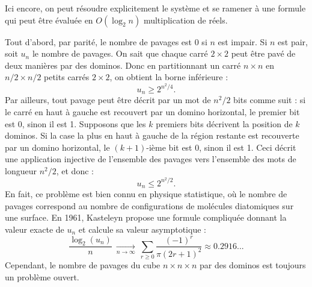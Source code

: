 

Ici encore, on peut résoudre explicitement le système et se ramener à une formule qui peut être évaluée en $O(\log_2n)$ multiplication de réels.

\Q
Tout d'abord, par parité, le nombre de pavages est 0 si $n$ est impair. Si $n$ est pair, soit $u_n$ le nombre de pavages. On sait que chaque carré $2 \times 2$ peut être pavé de deux manières par des dominos. Donc en partitionnant un carré $n \times n$ en $n/2 \times n/2$ petits carrés $2 \times 2$, on obtient la borne inférieure :
\[
    u_n \geq 2^{n^2/4}.
\]
Par ailleurs, tout pavage peut être décrit par un mot de $n^2/2$ bits comme suit : si le carré en haut à gauche est recouvert par un domino horizontal, le premier bit est 0, sinon il est 1. Supposons que les $k$ premiers bits décrivent la position de $k$ dominos. Si la case la plus en haut à gauche de la région restante est recouverte par un domino horizontal, le $(k+1)$-ième bit est 0, sinon il est 1. Ceci décrit une application injective de l'ensemble des pavages vers l'ensemble des mots de longueur $n^2/2$, et donc :
\[
    u_n \leq 2^{n^2/2}.
\]
En fait, ce problème est bien connu en physique statistique, où le nombre de pavages correspond au nombre de configurations de molécules diatomiques sur une surface. En 1961, Kasteleyn propose une formule compliquée donnant la valeur exacte de $u_n$ et calcule sa valeur asymptotique :
\[
    \frac{\log_2(u_n)}{n}\ \xrightarrow[n\to\infty]{}\ \sum_{r \geq 0}\frac{(-1)^r}{\pi(2r+1)^2} \approx 0.2916...
\]
Cependant, le nombre de pavages du cube $n \times n \times n$ par des dominos est toujours un problème ouvert.
\bigskip

\Fin
